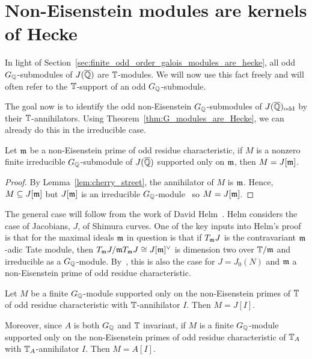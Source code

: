 \documentclass[11pt, proquest]{uwthesis}
\begin{document}
\section{Non-Eisenstein modules are kernels of Hecke}%
\label{sec:non_eisenstein_modules_are_kernels_of_hecke}

In light of Section~\ref{sec:finite_odd_order_galois_modules_are_hecke}, all
odd $G_{\mathbb{Q}}$-submodules of $J(\overline{\mathbb{Q}})$ are $\mathbb{T}$-modules. We will now
use this fact freely and will often refer to the $\mathbb{T}$-support of an odd
$G_{\mathbb{Q}}$-submodule.

The goal now is to identify the odd non-Eisenstein $G_{\mathbb{Q}}$-submodules of
$J(\overline{\mathbb{Q}})_{\mathrm{odd}}$ by their $\mathbb{T}$-annihilators. Using
Theorem~\ref{thm:G_modules_are_Hecke}, we can already do this in the
irreducible case.
\begin{corollary}
    Let $\mathfrak{m}$ be a non-Eisenstein prime of odd residue characteristic, if $M$ is
    a nonzero finite irreducible $G_{\mathbb{Q}}$-submodule of $J(\overline{\mathbb{Q}})$ supported
    only on $\mathfrak{m}$, then $M=J[\mathfrak{m}]$.
\end{corollary}
\begin{proof}
    By Lemma~\ref{lem:cherry_street}, the annihilator of $M$ is $\mathfrak{m}$. Hence,
    $M\subseteq J[\mathfrak{m}]$ but $J[\mathfrak{m}]$ is an irreducible
    $G_{\mathbb{Q}}$-module~\cite[Proposition 14.2]{mazur:eisenstein} so $M=J[\mathfrak{m}]$.
\end{proof}

The general case will follow from the work of David Helm~\cite{helm:jacobian}.
Helm considers the case of Jacobians, $J$, of Shimura curves. One of the key
inputs into Helm's proof is that for the maximal ideals $\mathfrak{m}$ in question is
that if $T_{\mathfrak{m}} J$ is the contravariant $\mathfrak{m}$-adic Tate module, then $T_{\mathfrak{m}} J/\mathfrak{m}
T_{\mathfrak{m}} J\cong J[\mathfrak{m}]^\vee$ is dimension two over $\mathbb{T}/\mathfrak{m}$ and irreducible as a
$G_{\mathbb{Q}}$-module. By~\cite[Prop. 14.2]{mazur:eisenstein}, this is also the case
for $J=J_0(N)$ and $\mathfrak{m}$ a non-Eisenstein prime of odd residue characteristic.

\begin{theorem}%
    \label{thm:non_eisenstein_kernel_hecke}
    Let $M$ be a finite $G_{\mathbb{Q}}$-module supported only on the non-Eisenstein
    primes of $\mathbb{T}$ of odd residue characteristic with $\mathbb{T}$-annihilator $I$.
    Then $M=J[I]$.

    Moreover, since $A$ is both $G_{\mathbb{Q}}$ and $\mathbb{T}$ invariant, if $M$ is a finite
    $G_{\mathbb{Q}}$-module supported only on the non-Eisenstein primes of odd residue
    characteristic of $\mathbb{T}_A$ with $\mathbb{T}_A$-annihilator $I$. Then $M=A[I]$.
\end{theorem}
\end{document}
